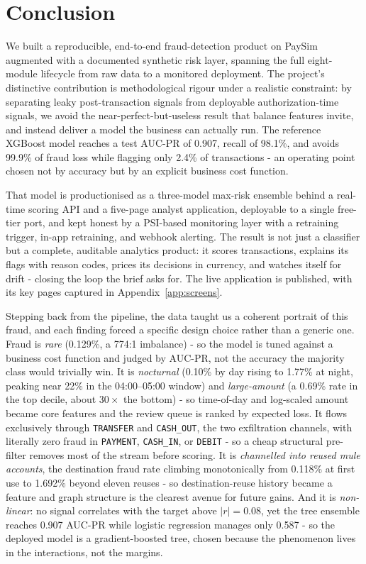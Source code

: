 \documentclass[11pt,a4paper]{report}
\newcommand{\code}[1]{\texttt{\small #1}}
\begin{document}
\chapter{Conclusion}
\label{ch:conclusion}

We built a reproducible, end-to-end fraud-detection product on PaySim augmented with a
documented synthetic risk layer, spanning the full eight-module lifecycle from raw data to a
monitored deployment. The project's distinctive contribution is methodological rigour under a
realistic constraint: by separating leaky post-transaction signals from deployable
authorization-time signals, we avoid the near-perfect-but-useless result that balance
features invite, and instead deliver a model the business can actually run. The reference
XGBoost model reaches a test AUC-PR of 0.907, recall of 98.1\%, and avoids 99.9\% of fraud
loss while flagging only 2.4\% of transactions - an operating point chosen not by accuracy
but by an explicit business cost function.

That model is productionised as a three-model max-risk ensemble behind a real-time scoring
API and a five-page analyst application, deployable to a single free-tier port, and kept
honest by a PSI-based monitoring layer with a retraining trigger, in-app retraining, and
webhook alerting. The result is not just a classifier but a complete, auditable analytics
product: it scores transactions, explains its flags with reason codes, prices its decisions
in currency, and watches itself for drift - closing the loop the brief asks for. The live
application is published, with its key pages captured in Appendix~\ref{app:screens}.

Stepping back from the pipeline, the data taught us a coherent portrait of this fraud, and each finding forced a specific design choice rather than a generic one. Fraud is \emph{rare} (0.129\%, a 774:1 imbalance) - so the model is tuned against a business cost function and judged by AUC-PR, not the accuracy the majority class would trivially win. It is \emph{nocturnal} (0.10\% by day rising to 1.77\% at night, peaking near 22\% in the 04:00--05:00 window) and \emph{large-amount} (a 0.69\% rate in the top decile, about $30\times$ the bottom) - so time-of-day and log-scaled amount became core features and the review queue is ranked by expected loss. It flows exclusively through \code{TRANSFER} and \code{CASH\_OUT}, the two exfiltration channels, with literally zero fraud in \code{PAYMENT}, \code{CASH\_IN}, or \code{DEBIT} - so a cheap structural pre-filter removes most of the stream before scoring. It is \emph{channelled into reused mule accounts}, the destination fraud rate climbing monotonically from 0.118\% at first use to 1.692\% beyond eleven reuses - so destination-reuse history became a feature and graph structure is the clearest avenue for future gains. And it is \emph{non-linear}: no signal correlates with the target above $|r|=0.08$, yet the tree ensemble reaches 0.907 AUC-PR while logistic regression manages only 0.587 - so the deployed model is a gradient-boosted tree, chosen because the phenomenon lives in the interactions, not the margins.
\end{document}
